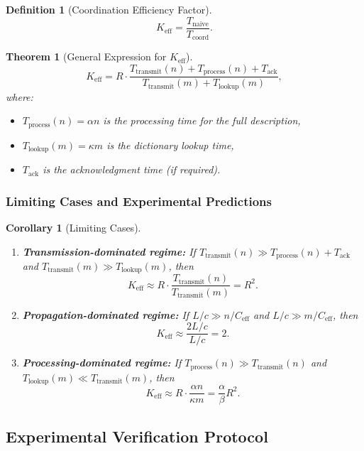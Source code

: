 \documentclass[11pt,a4paper]{article}
\newtheorem{theorem}{Theorem}
\newtheorem{definition}{Definition}
\newtheorem{corollary}{Corollary}
\begin{document}
\begin{definition}[Coordination Efficiency Factor]
	\[
	K_{\mathrm{eff}} = \frac{T_{\text{naive}}}{T_{\text{coord}}}.
	\]
\end{definition}

\begin{theorem}[General Expression for $K_{\mathrm{eff}}$]
	\label{thm:keff-expression}
	\[
	K_{\mathrm{eff}} = R \cdot \frac{T_{\text{transmit}}(n) + T_{\text{process}}(n) + T_{\text{ack}}}{T_{\text{transmit}}(m) + T_{\text{lookup}}(m)},
	\]
	where:
	\begin{itemize}
		\item $T_{\text{process}}(n) = \alpha n$ is the processing time for the full description,
		\item $T_{\text{lookup}}(m) = \kappa m$ is the dictionary lookup time,
		\item $T_{\text{ack}}$ is the acknowledgment time (if required).
	\end{itemize}
\end{theorem}

\subsubsection{Limiting Cases and Experimental Predictions}

\begin{corollary}[Limiting Cases]
	\begin{enumerate}
		\item \textbf{Transmission-dominated regime:} If $T_{\text{transmit}}(n) \gg T_{\text{process}}(n) + T_{\text{ack}}$ and $T_{\text{transmit}}(m) \gg T_{\text{lookup}}(m)$, then
		\[
		K_{\mathrm{eff}} \approx R \cdot \frac{T_{\text{transmit}}(n)}{T_{\text{transmit}}(m)} = R^2.
		\]
		
		\item \textbf{Propagation-dominated regime:} If $L/c \gg n/C_{\text{eff}}$ and $L/c \gg m/C_{\text{eff}}$, then
		\[
		K_{\mathrm{eff}} \approx \frac{2L/c}{L/c} = 2.
		\]
		
		\item \textbf{Processing-dominated regime:} If $T_{\text{process}}(n) \gg T_{\text{transmit}}(n)$ and $T_{\text{lookup}}(m) \ll T_{\text{transmit}}(m)$, then
		\[
		K_{\mathrm{eff}} \approx R \cdot \frac{\alpha n}{\kappa m} = \frac{\alpha}{\beta} R^2.
		\]
	\end{enumerate}
\end{corollary}

\subsection{Experimental Verification Protocol}
\end{document}
